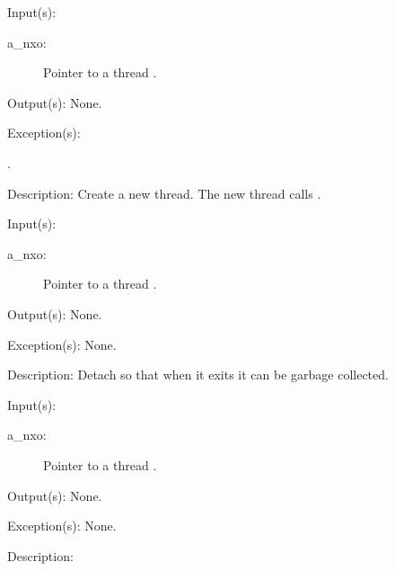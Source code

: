 \begin{capi}
	\begin{capilist}
	\item[Input(s): ]
		\begin{description}\item[]
		\item[a\_nxo: ]
			Pointer to a thread .
		\end{description}
	\item[Output(s): ] None.
	\item[Exception(s): ]
		\begin{description}\item[]
		\item[.]
		\end{description}
	\item[Description: ]
		Create a new thread.  The new thread calls
		.
	\end{capilist}
\label{nxo_thread_}
	\begin{capilist}
	\item[Input(s): ]
		\begin{description}\item[]
		\item[a\_nxo: ]
			Pointer to a thread \classname{nxo}.
		\end{description}
	\item[Output(s): ] None.
	\item[Exception(s): ] None.
	\item[Description: ]
		Detach  so that when it exits it can be garbage
		collected.
	\end{capilist}
\label{nxo_thread_join}
	\begin{capilist}
	\item[Input(s): ]
		\begin{description}\item[]
		\item[a\_nxo: ]
			Pointer to a thread .
		\end{description}
	\item[Output(s): ] None.
	\item[Exception(s): ] None.
	\item[Description: ]

\end{capilist}
\end{capi}
